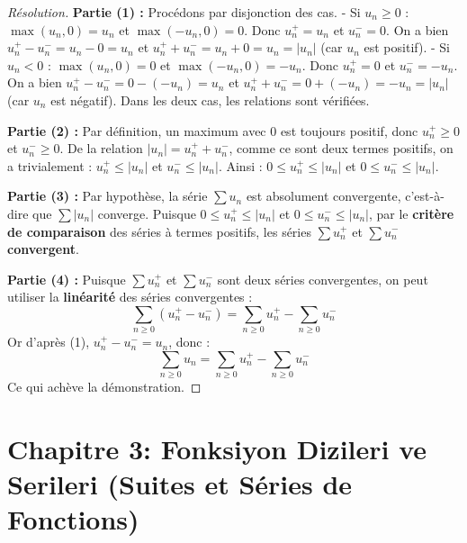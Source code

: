 \documentclass[12pt,a4paper]{report}
\begin{document}
\begin{proof}[Résolution]
\textbf{Partie (1) :} Procédons par disjonction des cas.
- Si $u_n \ge 0$ : $\max(u_n, 0) = u_n$ et $\max(-u_n, 0) = 0$. Donc $u_n^+ = u_n$ et $u_n^- = 0$.
On a bien $u_n^+ - u_n^- = u_n - 0 = u_n$ et $u_n^+ + u_n^- = u_n + 0 = u_n = |u_n|$ (car $u_n$ est positif).
- Si $u_n < 0$ : $\max(u_n, 0) = 0$ et $\max(-u_n, 0) = -u_n$. Donc $u_n^+ = 0$ et $u_n^- = -u_n$.
On a bien $u_n^+ - u_n^- = 0 - (-u_n) = u_n$ et $u_n^+ + u_n^- = 0 + (-u_n) = -u_n = |u_n|$ (car $u_n$ est négatif).
Dans les deux cas, les relations sont vérifiées.

\textbf{Partie (2) :} 
Par définition, un maximum avec 0 est toujours positif, donc $u_n^+ \ge 0$ et $u_n^- \ge 0$.
De la relation $|u_n| = u_n^+ + u_n^-$, comme ce sont deux termes positifs, on a trivialement :
$u_n^+ \le |u_n|$ et $u_n^- \le |u_n|$.
Ainsi : $0 \le u_n^+ \le |u_n|$ et $0 \le u_n^- \le |u_n|$.

\textbf{Partie (3) :} 
Par hypothèse, la série $\sum u_n$ est absolument convergente, c'est-à-dire que $\sum |u_n|$ converge.
Puisque $0 \le u_n^+ \le |u_n|$ et $0 \le u_n^- \le |u_n|$, par le \textbf{critère de comparaison} des séries à termes positifs, les séries $\sum u_n^+$ et $\sum u_n^-$ \textbf{convergent}.

\textbf{Partie (4) :} 
Puisque $\sum u_n^+$ et $\sum u_n^-$ sont deux séries convergentes, on peut utiliser la \textbf{linéarité} des séries convergentes :
\[ \sum_{n \ge 0} (u_n^+ - u_n^-) = \sum_{n \ge 0} u_n^+ - \sum_{n \ge 0} u_n^- \]
Or d'après (1), $u_n^+ - u_n^- = u_n$, donc :
\[ \sum_{n \ge 0} u_n = \sum_{n \ge 0} u_n^+ - \sum_{n \ge 0} u_n^- \]
Ce qui achève la démonstration.
\end{proof}

\chapter{Chapitre 3: Fonksiyon Dizileri ve Serileri (Suites et Séries de Fonctions)}
\end{document}
